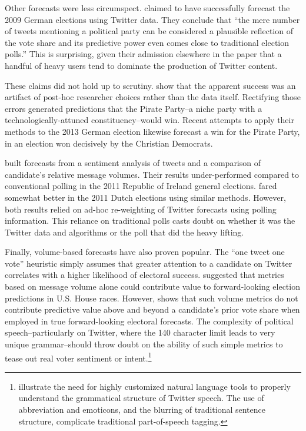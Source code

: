 \documentclass{article}
\begin{document}
Other forecasts were less circumspect. \cite{tumasjan2010election}
claimed to have successfully forecast the 2009 German elections using
Twitter data. They conclude that ``the mere number of tweets
mentioning a political party can be considered a plausible reflection
of the vote share and its predictive power even comes close to
traditional election polls.'' This is surprising, given their
admission elsewhere in the paper that a handful of heavy users tend to
dominate the production of Twitter content. 

These claims did not hold up to scrutiny.
\cite{jungherr2012pirate} show that the apparent success was an
artifact of post-hoc researcher choices rather than the data itself. Rectifying
those errors generated predictions that the Pirate Party--a niche
party with a technologically-attuned constituency--would win. Recent
attempts to apply their methods to the 2013 German election likewise
forecast a win for the Pirate Party, in an election won decisively by
the Christian Democrats.

\cite{bermingham2011using} built forecasts from a sentiment analysis
of tweets and a comparison of candidate's relative message
volumes. Their results under-performed compared to conventional
polling in the 2011 Republic of Ireland general
elections. \cite{sang2012predicting} fared somewhat better in the
2011 Dutch elections using similar methods. However, both results relied on ad-hoc
re-weighting of Twitter forecasts using polling information. This
reliance on traditional polls casts doubt on whether it was the
Twitter data and algorithms or the poll that did the heavy lifting.

Finally, volume-based forecasts have also proven popular. The ``one
tweet one vote'' heuristic simply assumes that greater attention to a
candidate on Twitter correlates with a higher likelihood of electoral
success. \cite{digrazia2013} suggested that metrics based on message
volume alone could contribute value to forward-looking election
predictions in U.S. House races. However, \cite{huberty2013twitter}
shows that such volume metrics do not contribute predictive value above
and beyond a candidate's prior vote share when employed in true
forward-looking electoral forecasts. The complexity of political
speech--particularly on Twitter, where the 140 character limit leads
to very unique grammar--should throw doubt on the ability of such
simple metrics to tease out real voter sentiment or
intent.\footnote{\cite{owoputi2013improved} illustrate the need for
  highly customized natural language tools to properly understand the
  grammatical structure of Twitter speech. The use of abbreviation and
  emoticons, and the blurring of traditional sentence structure,
  complicate traditional part-of-speech tagging.}
\end{document}
